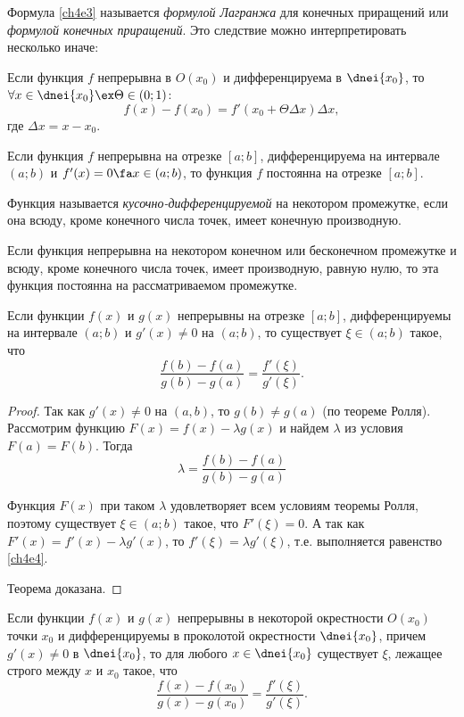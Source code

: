 Формула \eqref{ch4e3} называется \textit{формулой Лагранжа} для конечных приращений или \textit{формулой конечных приращений}.
Это следствие можно интерпретировать несколько иначе:

\begin{cons}
Если функция $f$ непрерывна в $O(x_0)$ и дифференцируема в $\dnei{x_0}$, то $\forall x \in \dnei{x_0} \ex \Theta \in (0;1)$:
$$
f(x) - f(x_0) = f'(x_0 + \Theta\Delta x)\Delta x,
$$
где $\Delta x=x-x_0$.
\end{cons}

\begin{cons}
Если функция $f$ непрерывна на отрезке $[a; b]$, дифференцируема на интервале $(a;b)$ и $f'(x) = 0 \fa x \in (a;b)$, то функция $f$ постоянна на отрезке $[a; b]$.	
\end{cons}

\begin{defn}Функция называется \textit{кусочно-дифференцируемой} на некотором промежутке, если она всюду, кроме конечного числа точек, имеет конечную производную.
\end{defn}

\begin{cons} Если функция непрерывна на некотором конечном или бесконечном промежутке и всюду, кроме конечного числа точек, имеет производную, равную нулю, то эта функция постоянна на рассматриваемом промежутке.
\end{cons}

\begin{thm}  Если функции $f(x)$ и $g(x)$ непрерывны на отрезке $[a; b]$, дифференцируемы на интервале $(a; b)$ и $g'(x) \ne 0$ на $(a; b)$, то существует $\xi \in (a; b)$ такое, что
\begin{equation}
\label{ch4e4}
\frac{f(b)-f(a)}{g(b)-g(a)}=\frac{f'(\xi)}{g'(\xi)}.
\end{equation}
\end{thm}

\begin{proof} Так как $g'(x) \ne 0$ на $(a,b)$, то $g(b)\ne g(a)$ (по теореме Ролля). Рассмотрим функцию $F(x) =f(x) - \lambda g(x)$ и найдем $\lambda$ из условия $F(a) = F(b)$. Тогда
$$
\lambda = \frac{f(b)-f(a)}{g(b)-g(a)}
$$

Функция $F(x)$ при таком $\lambda$ удовлетворяет всем условиям теоремы Ролля, поэтому существует $\xi \in (a; b)$ такое, что $F'(\xi) = 0$. А так как $F'(x) = f'(x) - \lambda g'(x)$, то $f'(\xi) = \lambda g'(\xi)$, т.е. выполняется равенство \eqref{ch4e4}.

Теорема доказана.
\end{proof}

\begin{cons} \label{ch4.1cons5}
	Если функции $f(x)$ и $g(x)$ непрерывны в некоторой окрестности $O(x_0)$ точки $x_0$ и дифференцируемы в проколотой
окрестности $\dnei{x_0}$, причем $g'(x) \ne 0$ в  $\dnei{x_0}$, то  для любого $x \in  \dnei{x_0}$ существует $\xi$, лежащее строго между $x$ и $x_0$ такое, что
$$
\frac{f(x)-f(x_0)}{g(x)-g(x_0)}=\frac{f'(\xi)}{g'(\xi)}.
$$
\end{cons}